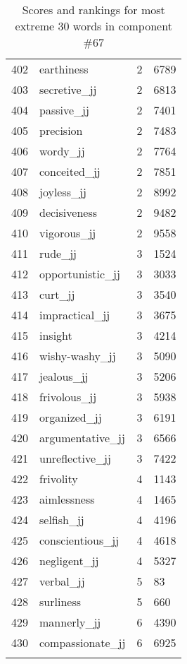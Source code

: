 \begin{longtable}[!htbp]{| rlr@{.}l |}
    402 & earthiness & 2 & 6789 \\
    403 & secretive\_jj & 2 & 6813 \\
    404 & passive\_jj & 2 & 7401 \\
    405 & precision & 2 & 7483 \\
    406 & wordy\_jj & 2 & 7764 \\
    407 & conceited\_jj & 2 & 7851 \\
    408 & joyless\_jj & 2 & 8992 \\
    409 & decisiveness & 2 & 9482 \\
    410 & vigorous\_jj & 2 & 9558 \\
    411 & rude\_jj & 3 & 1524 \\
    412 & opportunistic\_jj & 3 & 3033 \\
    413 & curt\_jj & 3 & 3540 \\
    414 & impractical\_jj & 3 & 3675 \\
    415 & insight & 3 & 4214 \\
    416 & wishy-washy\_jj & 3 & 5090 \\
    417 & jealous\_jj & 3 & 5206 \\
    418 & frivolous\_jj & 3 & 5938 \\
    419 & organized\_jj & 3 & 6191 \\
    420 & argumentative\_jj & 3 & 6566 \\
    421 & unreflective\_jj & 3 & 7422 \\
    422 & frivolity & 4 & 1143 \\
    423 & aimlessness & 4 & 1465 \\
    424 & selfish\_jj & 4 & 4196 \\
    425 & conscientious\_jj & 4 & 4618 \\
    426 & negligent\_jj & 4 & 5327 \\
    427 & verbal\_jj & 5 & 83 \\
    428 & surliness & 5 & 660 \\
    429 & mannerly\_jj & 6 & 4390 \\
    430 & compassionate\_jj & 6 & 6925 \\
    \hline
    \caption{Scores and rankings for most extreme 30 words in component \#67} \\
\end{longtable}
